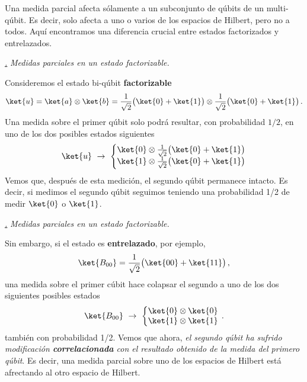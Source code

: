 \documentclass[a4paper,11pt]{book} %
\numberwithin{equation}{chapter}
\def\subsubiContadorIt{\par\addtocounter{subsubsection}{1}\underline{\it\thesubsubsection.}\hskip0.5cm \setcounter{subsubsubsectionIt}{0}}
\newcommand{\SubsubiIt}[1]{
		\subsubiContadorIt \textit{#1}
	}
\newcounter{subsubsubsectionIt}[subsubsection]
\begin{document}
Una medida parcial afecta sólamente a un subconjunto de qúbits de un multi-qúbit. Es decir, solo afecta a uno o varios de los espacios de Hilbert, pero no a todos. Aquí encontramos una diferencia crucial entre estados factorizados y entrelazados. 		
		
			\SubsubiIt{Medidas parciales en un estado factorizable.}
			 


Consideremos el estado bi-qúbit \textbf{factorizable} 
$$
\ket{u} = \ket{a}\otimes \ket{b} = \frac{1}{\sqrt{2}}\big( \ket{0} + \ket{1}\big)\otimes \frac{1}{\sqrt{2}}\big( \ket{0} + \ket{1}\big)\, .
$$
Una medida sobre el primer qúbit solo podrá resultar, con probabilidad $1/2$, en uno de los dos posibles estados siguientes  
$$
\ket{u} ~\rightarrow ~ \left\{ \begin{matrix}\ket{0} \otimes \frac{1}{\sqrt{2}}\big( \ket{0} + \ket{1}\big)\\ \ket{1} \otimes \frac{1}{\sqrt{2}}\big( \ket{0} + \ket{1}\big) \end{matrix} \right.
$$
Vemos que, después de esta medición, el segundo qúbit permanece intacto. Es decir, si medimos el segundo qúbit seguimos teniendo una probabilidad 1/2 de medir $\ket{0}$ o $\ket{1}$.

			\SubsubiIt{Medidas parciales en un estado factorizable.}

Sin embargo, si el estado es \textbf{entrelazado}, por ejemplo, 
$$
  \ket{B_{00}} = \frac{1}{\sqrt{2}}\big( \ket{00} + \ket{11} \big)\, ,
$$
una medida sobre el primer cúbit hace colapsar el segundo a uno de los dos siguientes posibles estados
$$
\ket{B_{00}} ~\rightarrow ~ \left\{ \begin{matrix}\ket{0}\otimes\ket{0}  \\ \ket{1}\otimes \ket{1}\end{matrix} \right. \, .
$$
también con probabilidad 1/2. Vemos que ahora, \textit{el segundo qúbit ha sufrido modificación  \textbf{correlacionada} con el resultado obtenido de la medida del primero qúbit}.  Es decir, una medida parcial sobre uno de los espacios de Hilbert está afrectando al otro espacio de Hilbert. 
\end{document}
